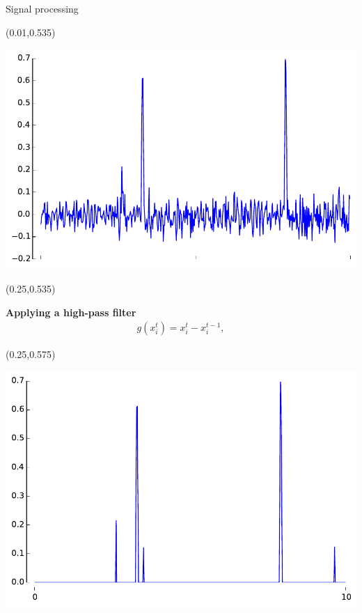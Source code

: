 \documentclass[final]{beamer}
\newenvironment{shaded2}{%
  \def\FrameCommand{\fboxsep=\FrameSep \colorbox{blue!20}}%
  \MakeFramed {\FrameRestore}}%
 {\endMakeFramed}
\begin{document}
\begin{frame}{}
\begin{textblock}{0.485}
\begin{block}{Signal processing \phantom{p}}
\begin{textblock}{0.485}(0.01,0.535)
\begin{minipage}{0.48\linewidth}
\begin{shaded}
\begin{center}

\includegraphics[width=0.85\linewidth]{images/diff_curve.pdf}
\end{center}
\end{shaded}
\end{minipage}
\end{textblock}

\begin{textblock}{0.485}(0.25,0.535)
\begin{minipage}{0.48\linewidth}
\begin{shaded}
\vspace{3pt}
{\color{lightgreen} \textbf{Applying a high-pass filter}}
\begin{align*}
g(x^{t}_{i}) = x^{t}_i - x^{t-1}_i,
\end{align*}
\vspace{5pt}
\end{shaded}
\end{minipage}
\end{textblock}

\begin{textblock}{0.485}(0.25,0.575)
\begin{minipage}{0.48\linewidth}
\begin{shaded2}
\begin{center}

\includegraphics[width=0.85\linewidth]{images/threshold_curve.pdf}
\end{center}


\end{shaded2}
\end{minipage}
\end{textblock}
\end{block}
\end{textblock}
\end{frame}
\end{document}
